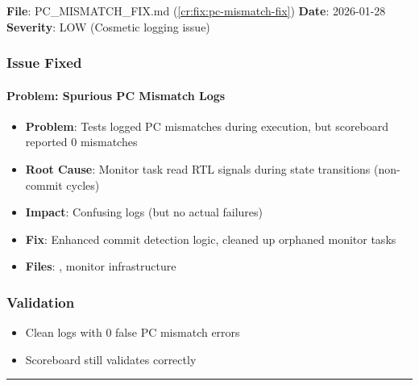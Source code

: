 \begin{record}

\textbf{File}:
PC\_\allowbreak{}MISMATCH\_\allowbreak{}FIX.md (\cref{cr:fix:pc-mismatch-fix})
\textbf{Date}: 2026-01-28 \textbf{Severity}: \ok{} LOW (Cosmetic logging
issue)

\end{record}

\subsubsection{Issue Fixed}\label{cr:fix:fixes-index:issue-fixed-1}

\paragraph{Problem: Spurious PC Mismatch Logs}\label{cr:fix:fixes-index:problem-spurious-pc-mismatch-logs}

\begin{record}

\begin{itemize}
\tightlist
\item
  \textbf{Problem}: Tests logged PC mismatches during execution, but
  scoreboard reported 0 mismatches
\item
  \textbf{Root Cause}: Monitor task read RTL signals during state
  transitions (non-commit cycles)
\item
  \textbf{Impact}: Confusing logs (but no actual failures)
\item
  \textbf{Fix}: Enhanced commit detection logic, cleaned up orphaned
  monitor tasks
\item
  \textbf{Files}: , monitor
  infrastructure
\end{itemize}

\end{record}

\subsubsection{Validation}\label{cr:fix:fixes-index:validation-3}

\begin{record}

\begin{itemize}
\tightlist
\item
  \ok{} Clean logs with 0 false PC mismatch errors
\item
  \ok{} Scoreboard still validates correctly
\end{itemize}

\begin{center}\rule{0.5\linewidth}{0.5pt}\end{center}

\end{record}

